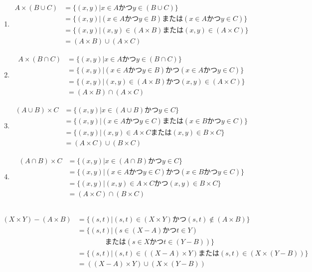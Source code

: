 \documentclass{jsarticle}
\begin{document}
\subsection{}
\begin{enumerate}
\item
\begin{align*}
A\times(B\cup C)&= \{(x,y)|x\in A かつy\in(B\cup C)\}\\
&=\{(x,y)|(x\in A かつ y\in B)または(x\in A かつ y\in C)\}\\
&=\{(x,y)|(x,y)\in (A\times B) または (x,y)\in(A\times C)\}\\
&=(A\times B) \cup (A\times C)
\end{align*}

\item
\begin{align*}
A\times(B\cap C)&= \{(x,y)|x\in A かつy\in(B\cap C)\}\\
&=\{(x,y)|(x\in A かつ y\in B)かつ(x\in A かつ y\in C)\}\\
&=\{(x,y)|(x,y)\in (A\times B) かつ (x,y)\in(A\times C)\}\\
&=(A\times B) \cap (A\times C)
\end{align*}

\item
\begin{align*}
(A\cup B)\times C&=\{(x,y)|x\in (A\cup B) かつ y\in C\}\\
&=\{(x,y)|(x\in A かつ y\in C)または(x\in B かつ y\in C)\}\\
&=\{(x,y)|(x,y)\in A\times C または (x,y)\in B \times C\}\\
&=(A\times C)\cup(B\times C)
\end{align*}

\item
\begin{align*}
(A\cap B)\times C&=\{(x,y)|x\in (A\cap B) かつ y\in C\}\\
&=\{(x,y)|(x\in A かつ y\in C)かつ(x\in B かつ y\in C)\}\\
&=\{(x,y)|(x,y)\in A\times C かつ (x,y)\in B \times C\}\\
&=(A\times C)\cap(B\times C)
\end{align*}

\end{enumerate}

\subsection{}
\begin{align*}
(X\times Y)-(A\times B)&=\{(s,t)|(s,t)\in(X\times Y)かつ(s,t)\notin(A\times B)\}\\
&=\{(s,t)|(s\in(X-A) かつ t\in Y)\\
&\qquad\qquad または(s\in X かつ t\in(Y-B))\}\\
&=\{(s,t)|(s,t)\in ((X-A)\times Y) または (s,t)\in(X\times (Y-B))\}\\
&=((X-A)\times Y)\cup(X\times(Y-B))
\end{align*}
\end{document}
